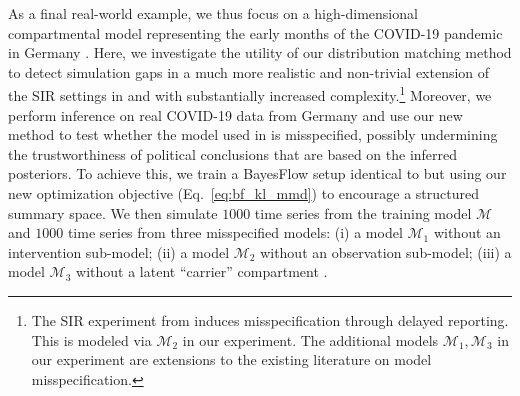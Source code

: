 \documentclass[twoside,11pt]{article}
\newcommand{\0}{\boldsymbol{0}}
\newcommand{\M}{\mathcal{M}}
\renewcommand{\cite}[1]{\citep{#1}}
\begin{document}
As a final real-world example, we thus focus on a high-dimensional compartmental model representing the early months of the COVID-19 pandemic in Germany \cite{outbreak}.
Here, we investigate the utility of our distribution matching method to detect simulation gaps in a much more realistic and non-trivial extension of the SIR settings in \citet{lueckmann_benchmarking_2021} and  \citet{ward_robust_2022} with substantially increased complexity.\footnote{The SIR experiment from \citet{ward_robust_2022} induces misspecification through delayed reporting. 
This is modeled via $\M_2$ in our experiment.
The additional models $\M_1, \M_3$ in our experiment are extensions to the existing literature on model misspecification.}
Moreover, we perform inference on real COVID-19 data from Germany and use our new method to test whether the model used in \citet{outbreak} is misspecified, possibly undermining the trustworthiness of political conclusions that are based on the inferred posteriors.
To achieve this, we train a BayesFlow setup identical to \citet{outbreak} but using our new optimization objective (Eq.~\ref{eq:bf_kl_mmd}) to encourage a structured summary space.
We then simulate $1000$ time series from the training model $\mathcal{M}$ and $1000$ time series from three misspecified models: (i) a model $\mathcal{M}_1$ without an intervention sub-model; (ii) a model $\mathcal{M}_2$ without an observation sub-model; (iii) a model $\mathcal{M}_3$ without a latent ``carrier'' compartment \cite{covid_germany}.
\end{document}
